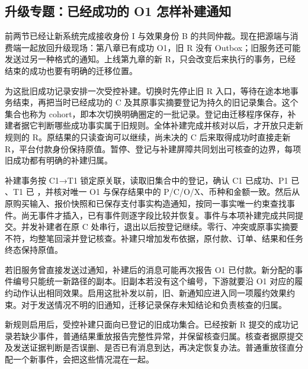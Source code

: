 \subsection*{升级专题：已经成功的 O1 怎样补建通知}

前两节已经让新系统完成接收身份 I 与效果身份 B 的共同仲裁。现在把源端与消费端一起放回升级现场：第八章已有成功 O1，旧 R 没有 Outbox；旧服务还可能发送过另一种格式的通知。上线第九章的新 R，只会改变后来执行的事务，已经结束的成功也要有明确的迁移位置。

为这批旧成功记录安排一次受控补建。切换时先停止旧 R 入口，等待在途本地事务结束，再把当时已经成功的 C 及其原事实摘要登记为持久的旧记录集合。这个集合也称为 cohort，即本次切换明确圈定的一批记录。登记由迁移程序保存，补建者据它判断哪些成功事实属于旧规则。全体补建完成并核对以后，才开放只走新规则的 R。原结果的只读查询可以继续，尚未决的 C 后来取得成功时直接走新 R，平台付款身份保持原值。暂停、登记与补建屏障共同划出可核查的边界，每项旧成功都有明确的补建归属。


补建事务按 C1→T1 锁定原关联，读取旧集合中的登记，确认 C1 已成功、P1 已 、T1 已 ，并核对唯一 O1 与保存结果中的 P/C/O/X、币种和金额一致。然后从原购买输入、报价快照和已保存支付事实构造通知，按同一事实唯一约束查找事件。尚无事件才插入，已有事件则逐字段比较并恢复。事件与本项补建完成共同提交。并发补建者在原 C 处串行，退出以后按登记继续。零行、冲突或原事实摘要不符，均整笔回滚并登记核查。补建只增加发布依据，原付款、订单、结果和任务终态保持原值。

若旧服务曾直接发送过通知，补建后的消息可能再次报告 O1 已付款。新分配的事件编号只能统一新路径的副本。旧副本若没有这个编号，下游就要沿 O1 对应的履约动作认出相同效果。启用这批补发以前，旧、新通知应进入同一项履约效果约束。对于发送情况不明的旧通知，迁移记录保存未知结论和负责核查的归属。

新规则启用后，受控补建只面向已登记的旧成功集合。已经按新 R 提交的成功记录若缺少事件，普通结果重放报告完整性异常，并保留核查归属。核查者据原提交及发送证据判断是否误删、是否已有消息到达，再决定恢复办法。普通重放径直分配一个新事件，会把这些情况混在一起。
